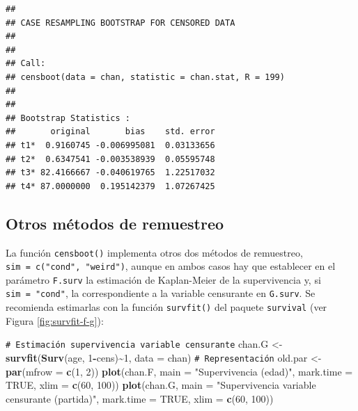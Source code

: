 \documentclass[
]{book}
\newenvironment{Shaded}{\begin{snugshade}}{\end{snugshade}}
\newcommand{\AttributeTok}[1]{\textcolor[rgb]{0.13,0.29,0.53}{#1}}
\newcommand{\CommentTok}[1]{\textcolor[rgb]{0.56,0.35,0.01}{\textit{#1}}}
\newcommand{\ConstantTok}[1]{\textcolor[rgb]{0.56,0.35,0.01}{#1}}
\newcommand{\DecValTok}[1]{\textcolor[rgb]{0.00,0.00,0.81}{#1}}
\newcommand{\FunctionTok}[1]{\textcolor[rgb]{0.13,0.29,0.53}{\textbf{#1}}}
\newcommand{\NormalTok}[1]{#1}
\newcommand{\OtherTok}[1]{\textcolor[rgb]{0.56,0.35,0.01}{#1}}
\newcommand{\SpecialCharTok}[1]{\textcolor[rgb]{0.81,0.36,0.00}{\textbf{#1}}}
\newcommand{\StringTok}[1]{\textcolor[rgb]{0.31,0.60,0.02}{#1}}
\theoremstyle{break}
\theoremstyle{nonumberplain}
\renewcommand{\CommentTok}[1]{\textcolor[rgb]{0.41,0.41,0.41}{\texttt{#1}}}
\begin{document}
\begin{verbatim}
## 
## CASE RESAMPLING BOOTSTRAP FOR CENSORED DATA
## 
## 
## Call:
## censboot(data = chan, statistic = chan.stat, R = 199)
## 
## 
## Bootstrap Statistics :
##       original       bias    std. error
## t1*  0.9160745 -0.006995081  0.03133656
## t2*  0.6347541 -0.003538939  0.05595748
## t3* 82.4166667 -0.040619765  1.22517032
## t4* 87.0000000  0.195142379  1.07267425
\end{verbatim}

\subsection{Otros métodos de remuestreo}\label{otros-muxe9todos-de-remuestreo}

La función \texttt{censboot()} implementa otros dos métodos de remuestreo,
\texttt{sim\ =\ c("cond",\ "weird")}, aunque en ambos casos hay que establecer en el
parámetro \texttt{F.surv} la estimación de Kaplan-Meier de la supervivencia y,
si \texttt{sim\ =\ "cond"}, la correspondiente a la variable censurante en \texttt{G.surv}.
Se recomienda estimarlas con la función \texttt{survfit()} del paquete \texttt{survival}
(ver Figura \ref{fig:survfit-f-g}):

\begin{Shaded}
\begin{Highlighting}[]
\CommentTok{\# Estimación supervivencia variable censurante}
\NormalTok{chan.G }\OtherTok{\textless{}{-}} \FunctionTok{survfit}\NormalTok{(}\FunctionTok{Surv}\NormalTok{(age, }\DecValTok{1}\SpecialCharTok{{-}}\NormalTok{cens)}\SpecialCharTok{\textasciitilde{}}\DecValTok{1}\NormalTok{, }\AttributeTok{data =}\NormalTok{ chan)}
\CommentTok{\# Representación}
\NormalTok{old.par }\OtherTok{\textless{}{-}} \FunctionTok{par}\NormalTok{(}\AttributeTok{mfrow =} \FunctionTok{c}\NormalTok{(}\DecValTok{1}\NormalTok{, }\DecValTok{2}\NormalTok{))}
\FunctionTok{plot}\NormalTok{(chan.F, }\AttributeTok{main =} \StringTok{"Supervivencia (edad)"}\NormalTok{, }\AttributeTok{mark.time =} \ConstantTok{TRUE}\NormalTok{, }
    \AttributeTok{xlim =} \FunctionTok{c}\NormalTok{(}\DecValTok{60}\NormalTok{, }\DecValTok{100}\NormalTok{))}
\FunctionTok{plot}\NormalTok{(chan.G, }\AttributeTok{main =} \StringTok{"Supervivencia variable censurante (partida)"}\NormalTok{, }
     \AttributeTok{mark.time =} \ConstantTok{TRUE}\NormalTok{, }\AttributeTok{xlim =} \FunctionTok{c}\NormalTok{(}\DecValTok{60}\NormalTok{, }\DecValTok{100}\NormalTok{))}
\end{Highlighting}
\end{Shaded}
\end{document}
